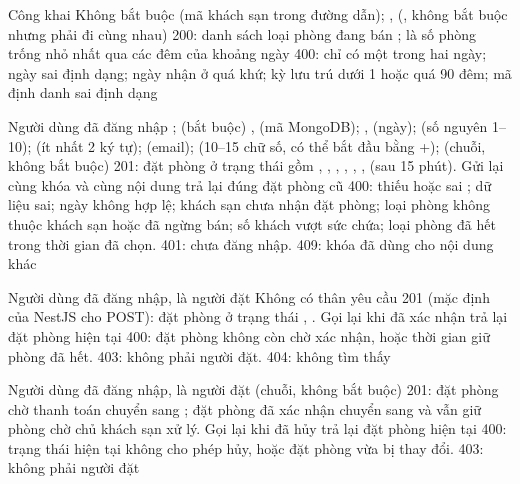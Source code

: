 {}
{Công khai}
{Không bắt buộc}
{ (mã khách sạn trong đường dẫn); ,  (, không bắt buộc nhưng phải đi cùng nhau)}
{200: danh sách loại phòng đang bán ;  là số phòng trống nhỏ nhất qua các đêm của khoảng ngày}
{400: chỉ có một trong hai ngày; ngày sai định dạng; ngày nhận ở quá khứ; kỳ lưu trú dưới 1 hoặc quá 90 đêm; mã định danh sai định dạng}

{}
{Người dùng đã đăng nhập}
{;  (bắt buộc)}
{,  (mã MongoDB); ,  (ngày);  (số nguyên 1--10);  (ít nhất 2 ký tự);  (email);  (10--15 chữ số, có thể bắt đầu bằng +);  (chuỗi, không bắt buộc)}
{201: đặt phòng ở trạng thái  gồm , , , , , ,  (sau 15 phút). Gửi lại cùng khóa và cùng nội dung trả lại đúng đặt phòng cũ}
{400: thiếu hoặc sai ; dữ liệu sai; ngày không hợp lệ; khách sạn chưa nhận đặt phòng; loại phòng không thuộc khách sạn hoặc đã ngừng bán; số khách vượt sức chứa; loại phòng đã hết trong thời gian đã chọn. 401: chưa đăng nhập. 409: khóa đã dùng cho nội dung khác}

{}
{Người dùng đã đăng nhập, là người đặt}
{}
{Không có thân yêu cầu}
{201 (mặc định của NestJS cho POST): đặt phòng ở trạng thái , . Gọi lại khi đã xác nhận trả lại đặt phòng hiện tại}
{400: đặt phòng không còn chờ xác nhận, hoặc thời gian giữ phòng đã hết. 403: không phải người đặt. 404: không tìm thấy}

{}
{Người dùng đã đăng nhập, là người đặt}
{}
{ (chuỗi, không bắt buộc)}
{201: đặt phòng chờ thanh toán chuyển sang ; đặt phòng đã xác nhận chuyển sang  và vẫn giữ phòng chờ chủ khách sạn xử lý. Gọi lại khi đã hủy trả lại đặt phòng hiện tại}
{400: trạng thái hiện tại không cho phép hủy, hoặc đặt phòng vừa bị thay đổi. 403: không phải người đặt}

